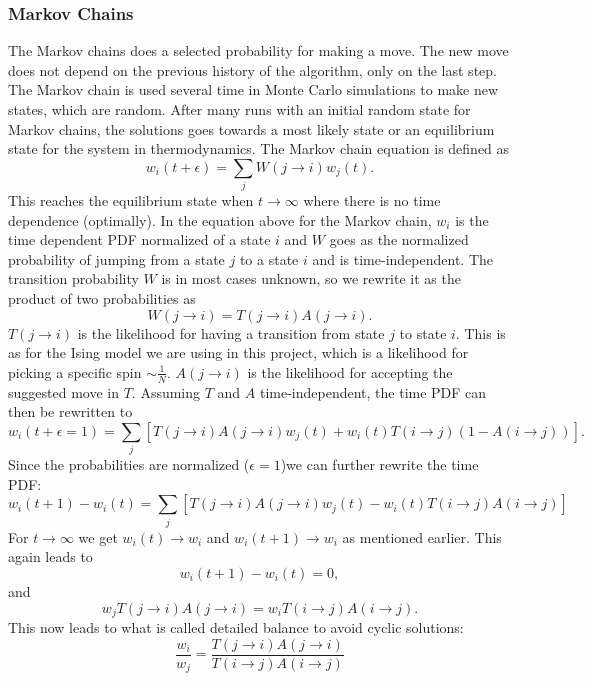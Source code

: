 \documentclass[12pt,a4paper,english]{article}
\begin{document}
\subsubsection{Markov Chains}
\label{subsubsect:Markov}
The Markov chains does a selected probability for making a move. The new move does not depend on the previous history of the algorithm, only on the last step. The Markov chain is used several time in Monte Carlo simulations to make new states, which are random. After many runs with an initial random state for Markov chains, the solutions goes towards a most likely state or an equilibrium state for the system in thermodynamics. The Markov chain equation is defined as
\[w_i(t+\epsilon)=\sum_{j}W(j\rightarrow i)w_j(t).\]
This reaches the equilibrium state when $t\rightarrow\infty$ where there is no time dependence (optimally). In the equation above for the Markov chain, $w_i$ is the time dependent PDF normalized of a state $i$ and $W$ goes as the normalized probability of jumping from a state $j$ to a state $i$ and is time-independent. The transition probability $W$ is in most cases unknown, so we rewrite it as the product of two probabilities as
\[W(j\rightarrow i)=T(j\rightarrow i)A(j\rightarrow i).\]
$T(j\rightarrow i)$ is the likelihood for having a transition from state $j$ to state $i$. This is as for the Ising model we are using in this project, which is a likelihood for picking a specific spin $\sim \frac{1}{N}$. $A(j\rightarrow i)$ is the likelihood for accepting the suggested move in $T$. Assuming $T$ and $A$ time-independent, the time PDF can then be rewritten to 
\[w_i(t+\epsilon=1)=\sum_{j}\left[T(j\rightarrow i)A(j\rightarrow i)w_j(t)+w_i(t)T(i\rightarrow j)(1-A(i\rightarrow j))\right].\]
Since the probabilities are normalized ($\epsilon=1$)we can further rewrite the time PDF:
\[w_i(t+1)-w_i(t)=\sum_{j}\left[T(j\rightarrow i)A(j\rightarrow i)w_j(t)-w_i(t)T(i\rightarrow j)A(i\rightarrow j)\right]\]
For $t\rightarrow\infty$ we get $w_i(t)\rightarrow w_i$ and $w_i(t+1)\rightarrow w_i$ as mentioned earlier. This again leads to \[w_i(t+1)-w_i(t)=0,\] and  
\[w_jT(j\rightarrow i)A(j\rightarrow i)=w_iT(i\rightarrow j)A(i\rightarrow j).\]
This now leads to what is called detailed balance to avoid cyclic solutions:
\begin{equation}
\label{eq:balance}
\frac{w_i}{w_j}=\frac{T(j\rightarrow i)A(j\rightarrow i)}{T(i\rightarrow j)A(i\rightarrow j)}
\end{equation}
\end{document}
